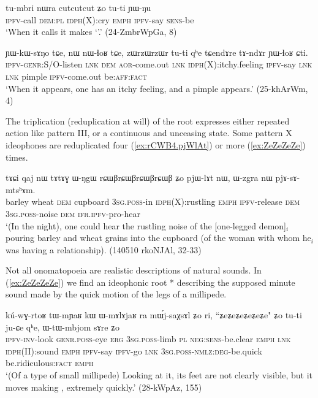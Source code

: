 \begin{exe}
\ex \label{ex:cutcutcut}
\gll    tu-mbri nɯra cutcutcut ʑo tu-ti ɲɯ-ŋu  \\
  \textsc{ipfv}-call \textsc{dem}:\textsc{pl} \textsc{idph}(X):cry \textsc{emph} \textsc{ipfv}-say \textsc{sens}-be \\
\glt  `When it calls it makes `'.' (24-ZmbrWpGa, 8)
\end{exe}

\begin{exe}
\ex \label{ex:zWrzWrzWr}
\gll ɲɯ-kɯ-sɤŋo tɕe, nɯ nɯ-ɬoʁ tɕe, zɯrzɯrzɯr tu-ti qʰe tɕendɤre tɤ-ndɤr ɲɯ-ɬoʁ ɕti.	\\
\textsc{ipfv}-\textsc{genr}:S/O-listen \textsc{lnk} \textsc{dem} \textsc{aor}-come.out \textsc{lnk} \textsc{idph}(X):itchy.feeling \textsc{ipfv}-say \textsc{lnk}  \textsc{lnk} pimple \textsc{ipfv}-come.out be:\textsc{aff}:\textsc{fact} \\
\glt `When it appears, one has an itchy feeling, and a pimple appears.' (25-khArWm, 4)
\end{exe}

The triplication (reduplication at will) of the root expresses either repeated action like pattern III, or a continuous and unceasing state. Some pattern X ideophones are reduplicated four (\ref{ex:rCWB4.pjWlAt}) or more (\ref{ex:ZeZeZeZe}) times. 

\begin{exe}
\ex \label{ex:rCWB4.pjWlAt}
\gll tɤɕi qaj nɯ tɤtɤɣ ɯ-ŋgɯ rɕɯβrɕɯβrɕɯβrɕɯβ ʑo pjɯ-lɤt nɯ, ɯ-zgra nɯ pjɤ-sɤ-mtsʰɤm.  \\
barley wheat \textsc{dem} cupboard \textsc{3sg}.\textsc{poss}-in \textsc{idph}(X):rustling \textsc{emph} \textsc{ipfv}-release \textsc{dem} \textsc{3sg}.\textsc{poss}-noise \textsc{dem} \textsc{ifr}.\textsc{ipfv}-pro-hear \\
\glt `(In the night), one could hear the rustling noise of the [one-legged demon]$_i$ pouring barley and wheat grains into the cupboard (of the woman with whom he$_i$ was having a relationship). (140510 rkoNJAl, 32-33)
\end{exe}

Not all onomatopoeia are realistic descriptions of natural sounds. In (\ref{ex:ZeZeZeZe}) we find an ideophonic root * describing the supposed minute sound made by the quick motion of the legs of a millipede.

\begin{exe}
\ex \label{ex:ZeZeZeZe}
\gll kú-wɣ-rtoʁ tɯ-mɲaʁ kɯ ɯ-mɤlɤjaʁ ra mɯ́j-saχsɤl ʑo ri, ``ʑeʑeʑeʑeʑeʑe" ʑo tu-ti ju-ɕe qʰe, ɯ-tɯ-mbjom sɤre ʑo \\
\textsc{ipfv}-\textsc{inv}-look \textsc{genr}.\textsc{poss}-eye \textsc{erg} \textsc{3sg}.\textsc{poss}-limb \textsc{pl} \textsc{neg}:\textsc{sens}-be.clear \textsc{emph} \textsc{lnk} \textsc{idph}(II):sound \textsc{emph} \textsc{ipfv}-say \textsc{ipfv}-go \textsc{lnk} \textsc{3sg}.\textsc{poss}-\textsc{nmlz}:\textsc{deg}-be.quick be.ridiculous:\textsc{fact} \textsc{emph} \\
\glt `(Of a type of small millipede) Looking at it, its feet are not clearly visible, but it moves making , extremely quickly.' (28-kWpAz, 155)
\end{exe} 

